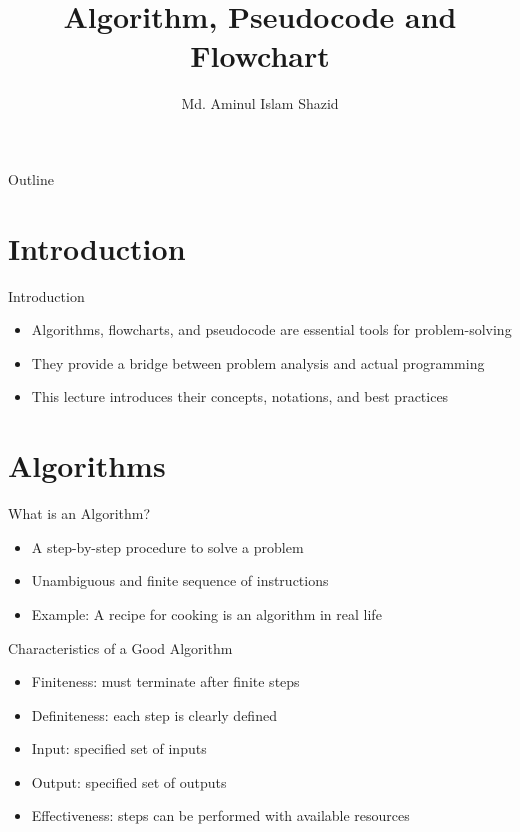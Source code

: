 \documentclass[12pt, aspectratio=169]{beamer}
\title{Algorithm, Pseudocode and Flowchart}
\author{Md. Aminul Islam Shazid}
\date{}
\begin{document}
    {
		\addtocounter{framenumber}{-2}    %

		\begin{frame}
			\titlepage
		\end{frame}

		\begin{frame}{Outline}
            \vfill
			\tableofcontents[subsectionstyle=hide]
            \vfill
		\end{frame}
	}


    \section{Introduction}
    \begin{frame}{Introduction}
        \begin{itemize}
            \item Algorithms, flowcharts, and pseudocode are essential tools for problem-solving
            \item They provide a bridge between problem analysis and actual programming
            \item This lecture introduces their concepts, notations, and best practices
        \end{itemize}
    \end{frame}


    \section{Algorithms}


    \begin{frame}{What is an Algorithm?}
        \begin{itemize}
            \item A step-by-step procedure to solve a problem
            \item Unambiguous and finite sequence of instructions
            \item Example: A recipe for cooking is an algorithm in real life
        \end{itemize}
    \end{frame}


    \begin{frame}{Characteristics of a Good Algorithm}
        \begin{itemize}
            \item Finiteness: must terminate after finite steps
            \item Definiteness: each step is clearly defined
            \item Input: specified set of inputs
            \item Output: specified set of outputs
            \item Effectiveness: steps can be performed with available resources
        \end{itemize}
    \end{frame}
\end{document}
